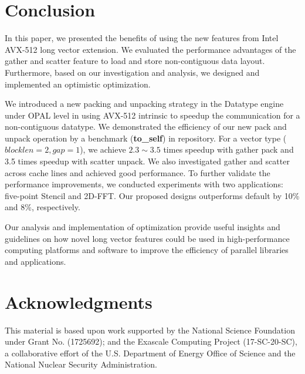 \documentclass[conference]{IEEEtran}
\begin{document}
\section{Conclusion}\label{sec:conclusion}
In this paper, we presented the benefits of using the new features from
Intel AVX-512 long vector extension. We evaluated the performance advantages
of the gather and scatter feature to load and store non-contiguous data layout.
Furthermore, based on our investigation and analysis, we designed and implemented
an optimistic \mpi optimization.
%

We introduced a new packing and unpacking strategy in the Datatype engine under OPAL
level in \ompi using AVX-512 intrinsic to speedup the communication for a non-contiguous datatype.
We demonstrated the efficiency of our new pack and unpack operation by a benchmark (\textbf{to\_self})
in \ompi repository. For a vector type ($blocklen = 2, gap =1$), we
achieve $2.3 \sim 3.5$ times speedup with gather pack and 3.5 times speedup with
scatter unpack. We also investigated gather and scatter across cache lines and achieved good performance.
To further validate the performance improvements, we conducted experiments with two applications: five-point Stencil and 2D-FFT. Our proposed designs outperforms default \ompi by 10\% and 8\%, respectively.

Our analysis and implementation of \ompi optimization provide useful insights and guidelines on how
novel long vector features could be used in high-performance computing platforms and
software to improve the efficiency of parallel libraries and applications.

\section{Acknowledgments}
%
This material is based upon work supported by the National Science Foundation under Grant No. (1725692); and the Exascale Computing Project (17-SC-20-SC), a collaborative effort of the
U.S. Department of Energy Office of Science and the National Nuclear Security Administration.

%


\end{document}
